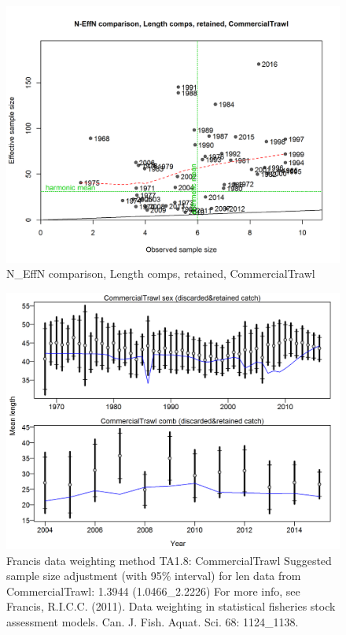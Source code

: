 \documentclass[12pt,]{article}
\begin{document}
\begin{figure}[htbp]
\centering
\includegraphics{./r4ss/plots_mod1/comp_lenfit_sampsize_flt1mkt2.png}
\caption{N\_EffN comparison, Length comps, retained, CommercialTrawl
\label{fig:mod1_4_comp_lenfit_sampsize_flt1mkt2}}
\end{figure}

\begin{figure}[htbp]
\centering
\includegraphics{./r4ss/plots_mod1/comp_lenfit_data_weighting_TA1.8_CommercialTrawl.png}
\caption{Francis data weighting method TA1.8: CommercialTrawl Suggested
sample size adjustment (with 95\% interval) for len data from
CommercialTrawl: 1.3944 (1.0466\_2.2226) For more info, see Francis,
R.I.C.C. (2011). Data weighting in statistical fisheries stock
assessment models. Can. J. Fish. Aquat. Sci. 68: 1124\_1138.
\label{fig:mod1_5_comp_lenfit_data_weighting_TA1.8_CommercialTrawl}}
\end{figure}
\end{document}
